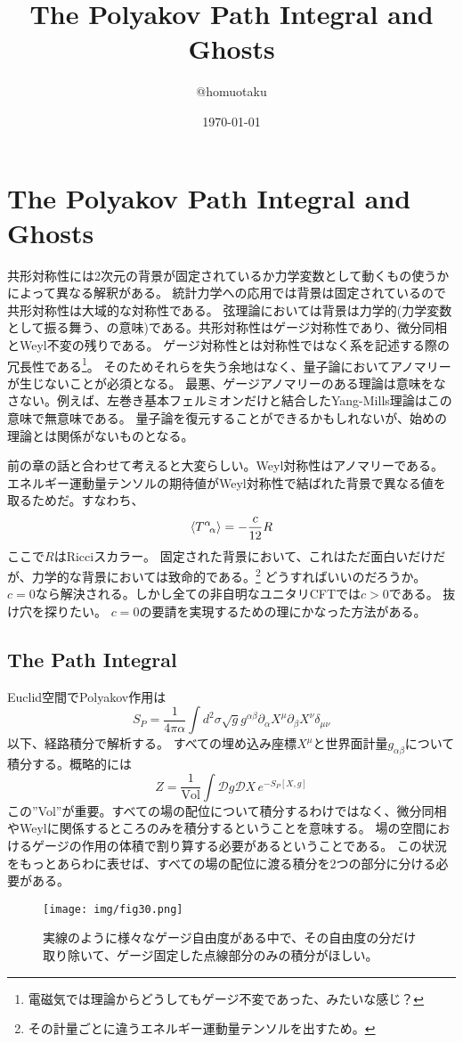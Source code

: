 \documentclass[10pt]{jsarticle}
\title{The Polyakov Path Integral and Ghosts}
\author{@homuotaku}
\date{\today}
\newcommand{\del}{{\partial}} %
\begin{document}
\maketitle
\tableofcontents
\setcounter{section}{4}
\section{The Polyakov Path Integral and Ghosts}
共形対称性には2次元の背景が固定されているか力学変数として動くもの使うかによって異なる解釈がある。
統計力学への応用では背景は固定されているので共形対称性は大域的な対称性である。
弦理論においては背景は力学的(力学変数として振る舞う、の意味)である。共形対称性はゲージ対称性であり、微分同相とWeyl不変の残りである。
ゲージ対称性とは対称性ではなく系を記述する際の冗長性である\footnote{電磁気では理論からどうしてもゲージ不変であった、みたいな感じ？}。
そのためそれらを失う余地はなく、量子論においてアノマリーが生じないことが必須となる。
最悪、ゲージアノマリーのある理論は意味をなさない。例えば、左巻き基本フェルミオンだけと結合したYang-Mills理論はこの意味で無意味である。
量子論を復元することができるかもしれないが、始めの理論とは関係がないものとなる。

前の章の話と合わせて考えると大変らしい。Weyl対称性はアノマリーである。
エネルギー運動量テンソルの期待値がWeyl対称性で結ばれた背景で異なる値を取るためだ。すなわち、
\begin{equation}
  \braket{T^{\alpha}\!{}_{\alpha}}=-\frac{c}{12}R 
\end{equation}
ここで$R$はRicciスカラー。
固定された背景において、これはただ面白いだけだが、力学的な背景においては致命的である。\footnote{その計量ごとに違うエネルギー運動量テンソルを出すため。}
どうすればいいのだろうか。
$c=0$なら解決される。しかし全ての非自明なユニタリCFTでは$c>0$である。
抜け穴を探りたい。
$c=0$の要請を実現するための理にかなった方法がある。
\subsection{The Path Integral}
Euclid空間でPolyakov作用は
\begin{equation}
  S_{P}=\frac{1}{4\pi \alpha}\int d^{2}\sigma \sqrt{g}g^{\alpha \beta}\del_{\alpha}X^{\mu}\del_{\beta}X^{\nu}\delta_{\mu\nu}
\end{equation}
以下、経路積分で解析する。 すべての埋め込み座標$X^{\mu}$と世界面計量$g_{\alpha \beta}$について積分する。概略的には
\begin{equation}
  Z=\frac{1}{\mathrm{Vol}}\int \mathcal{D}g\mathcal{D}X \, e^{-S_{P}[X,g]}
\end{equation}
この''Vol''が重要。すべての場の配位について積分するわけではなく、微分同相やWeylに関係するところのみを積分するということを意味する。
場の空間におけるゲージの作用の体積で割り算する必要があるということである。
この状況をもっとあらわに表せば、すべての場の配位に渡る積分を2つの部分に分ける必要がある。
\begin{figure}[H]
  \centering
  \texttt{[image: img/fig30.png]}
  \caption{実線のように様々なゲージ自由度がある中で、その自由度の分だけ取り除いて、ゲージ固定した点線部分のみの積分がほしい。}
  \label{fig30}
\end{figure}
\end{document}
